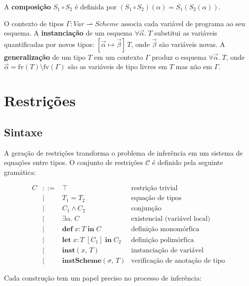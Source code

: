  A \textbf{composição} \(S_1 \circ S_2\) é definida por
  \((S_1 \circ S_2)(\alpha) = S_1(S_2(\alpha))\).

  O contexto de tipos \(\Gamma : \mathit{Var} \rightharpoonup
  \mathit{Scheme}\) associa cada variável de programa ao seu esquema.
  A \textbf{instanciação} de um esquema \(\forall
  \vec{\alpha}.\; T\) substitui as variáveis
  quantificadas por novos tipos: \([\vec{\alpha} \mapsto
  \vec{\beta}]\, T\), onde \(\vec{\beta}\) são variáveis novas. A
  \textbf{generalização} de um tipo \(T\) em um contexto \(\Gamma\)
  produz o esquema \(\forall \vec{\alpha}.\; T\), onde \(\vec{\alpha} =
  \mathrm{fv}(T) \setminus \mathrm{fv}(\Gamma)\) são as variáveis de
  tipo livres em \(T\) mas não em \(\Gamma\).

  \section{Restrições}

  \subsection{Sintaxe}

  A geração de restrições transforma o problema de inferência em um
  sistema de equações entre tipos. O conjunto de restrições
  \(\mathcal{C}\) é definido pela seguinte gramática:

  \[
    \begin{array}{rcll} C & ::= & \top & \text{restrição trivial} \\ & | & T_1
      = T_2 & \text{equação de tipos} \\ & | & C_1 \wedge C_2 & \text{conjunção}
      \\ & | & \exists \alpha.\; C & \text{existencial (variável
      local)} \\ & | &
      \mathbf{def}\; x : T\; \mathbf{in}\; C & \text{definição
      monomórfica} \\ & | &
      \mathbf{let}\; x : T\; [C_1]\; \mathbf{in}\; C_2 & \text{definição
      polimórfica}
      \\ & | & \mathbf{inst}(x,\, T) & \text{instanciação de variável} \\ & | &
      \mathbf{instScheme}(\sigma,\, T) & \text{verificação de anotação de tipo}
    \end{array}
  \]

  Cada construção tem um papel preciso no processo de inferência:

